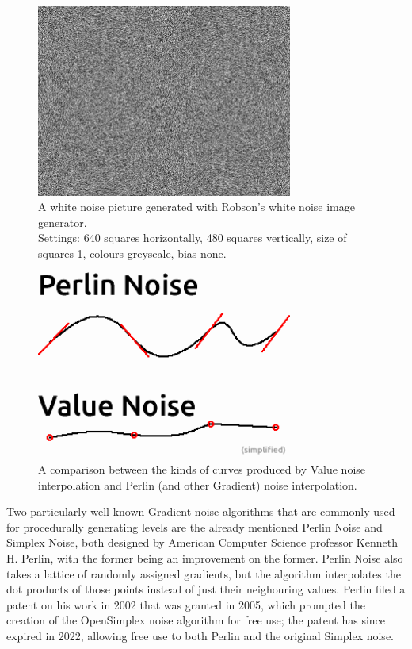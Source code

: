\begin{figure}[H]
    \centering
    \includegraphics[width=0.75\textwidth]{Images/whitenoisepic.png}
    \caption{A white noise picture generated with Robson's white noise image generator.\cite{whitenoisepicgen}\\Settings: 640 squares horizontally, 480 squares vertically, size of squares 1, colours greyscale, bias none.}
    \label{fig:whitenoisepic}
\end{figure}

\begin{figure}[H]
    \centering
    \includegraphics[width=0.75\textwidth]{Images/valueperlincomparison.png}
    \caption{A comparison between the kinds of curves produced by Value noise interpolation and Perlin (and other Gradient) noise interpolation.\cite{perlinvalue}}
    \label{fig:valueperlincomparison}
\end{figure}

Two particularly well-known Gradient noise algorithms that are commonly used for procedurally generating levels are the already mentioned Perlin Noise and Simplex Noise, both designed by American Computer Science professor Kenneth H. Perlin, with the former being an improvement on the former. Perlin Noise also takes a lattice of randomly assigned gradients, but the algorithm interpolates the dot products of those points instead of just their neighouring values.\cite{fastnoiselitedocs} Perlin filed a patent on his work in 2002 that was granted in 2005\cite{perlinpatent}, which prompted the creation of the OpenSimplex noise algorithm\cite{enwiki:1102898483} for free use; the patent has since expired in 2022, allowing free use to both Perlin and the original Simplex noise.\cite{perlinpatent}

